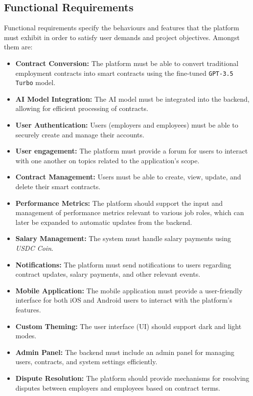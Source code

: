 \subsection{Functional Requirements}

Functional requirements specify the behaviours and features that the platform must exhibit in order to satisfy user demands and project objectives. Amongst them are:

\begin{itemize}
    \item \textbf{Contract Conversion:} The platform must be able to convert traditional employment contracts into smart contracts using the fine-tuned \texttt{GPT-3.5 Turbo} model.
    \item \textbf{AI Model Integration:} The AI model must be integrated into the backend, allowing for efficient processing of contracts.
    \item \textbf{User Authentication:} Users (employers and employees) must be able to securely create and manage their accounts.
    \item \textbf{User engagement:} The platform must provide a forum for users to interact with one another on topics related to the application's scope.
    \item \textbf{Contract Management:} Users must be able to create, view, update, and delete their smart contracts.
    \item \textbf{Performance Metrics:} The platform should support the input and management of performance metrics relevant to various job roles, which can later be expanded to automatic updates from the backend.
    \item \textbf{Salary Management:} The system must handle salary payments using \textit{USDC Coin}.
    \item \textbf{Notifications:} The platform must send notifications to users regarding contract updates, salary payments, and other relevant events.
    \item \textbf{Mobile Application:} The mobile application must provide a user-friendly interface for both iOS and Android users to interact with the platform's features.
    \item \textbf{Custom Theming:} The user interface (UI) should support dark and light modes.
    \item \textbf{Admin Panel:} The backend must include an admin panel for managing users, contracts, and system settings efficiently.
    \item \textbf{Dispute Resolution:} The platform should provide mechanisms for resolving disputes between employers and employees based on contract terms.
\end{itemize}

